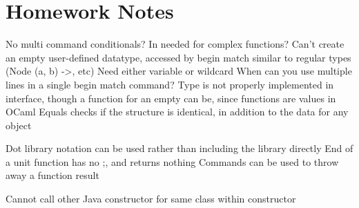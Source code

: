 \documentclass[11 pt, twoside]{article}
\newenvironment{outline*}
{
	\begin{outline}[enumerate]
	}
	{\end{outline}
}
\begin{document}
\section{Homework Notes}
\begin{outline*}
\1 No multi command conditionals?
\1 In needed for complex functions?
\1 Can't create an empty user-defined datatype, accessed by begin match similar to regular types (Node (a, b) ->, etc)
\1 Need either variable or wildcard
\1 When can you use multiple lines in a single begin match command?
\1 Type is not properly implemented in interface, though a function for an empty can be, since functions are values in OCaml
\1 Equals checks if the structure is identical, in addition to the data for any object

\1 Dot library notation can be used rather than including the library directly
\1 End of a unit function has no ;, and returns nothing
\1 Commands can be used to throw away a function result

\1 Cannot call other Java constructor for same class within constructor
\end{outline*}
\end{document}
